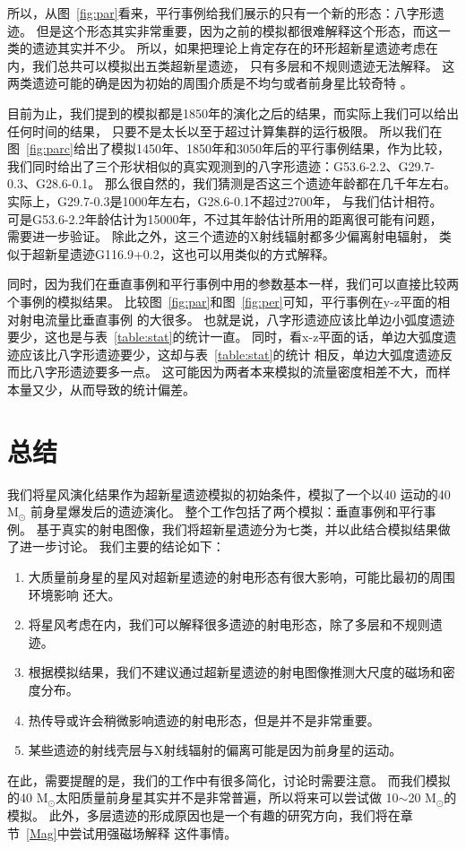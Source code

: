 所以，从图~\ref{fig:par}看来，平行事例给我们展示的只有一个新的形态：八字形遗迹。
但是这个形态其实非常重要，因为之前的模拟都很难解释这个形态，而这一类的遗迹其实并不少。
所以，如果把理论上肯定存在的环形超新星遗迹考虑在内，我们总共可以模拟出五类超新星遗迹，
只有多层和不规则遗迹无法解释。
这两类遗迹可能的确是因为初始的周围介质是不均匀或者前身星比较奇特
\citep{Orlando2007,Orlando2017}。

目前为止，我们提到的模拟都是1850年的演化之后的结果，而实际上我们可以给出任何时间的结果，
只要不是太长以至于超过计算集群的运行极限。
所以我们在图~\ref{fig:parc}给出了模拟1450年、1850年和3050年后的平行事例结果，作为比较，
我们同时给出了三个形状相似的真实观测到的八字形遗迹：G53.6-2.2、G29.7-0.3、G28.6-0.1。
那么很自然的，我们猜测是否这三个遗迹年龄都在几千年左右。
实际上，G29.7-0.3是1000年左右\citep{Leahy2008}，G28.6-0.1不超过2700年\citep{Bamba2001}，
与我们估计相符。
可是G53.6-2.2年龄估计为15000年\citet{Long1991}，不过其年龄估计所用的距离很可能有问题，
需要进一步验证。
除此之外，这三个遗迹的X射线辐射都多少偏离射电辐射\citep{Broersen2015,Su2009,Bamba2001}，
类似于超新星遗迹G116.9+0.2，这也可以用类似的方式解释。

同时，因为我们在垂直事例和平行事例中用的参数基本一样，我们可以直接比较两个事例的模拟结果。
比较图~\ref{fig:par}和图~\ref{fig:per}可知，平行事例在y-z平面的相对射电流量比垂直事例
的大很多。
也就是说，八字形遗迹应该比单边小弧度遗迹要少，这也是与表~\ref{table:stat}的统计一直。
同时，看x-z平面的话，单边大弧度遗迹应该比八字形遗迹要少，这却与表~\ref{table:stat}的统计
相反，单边大弧度遗迹反而比八字形遗迹要多一点。
这可能因为两者本来模拟的流量密度相差不大，而样本量又少，从而导致的统计偏差。

\section{总结}
\label{SWsum}
我们将星风演化结果作为超新星遗迹模拟的初始条件，模拟了一个以40 \kms 运动的40 M$_{\odot}$
前身星爆发后的遗迹演化。
整个工作包括了两个模拟：垂直事例和平行事例。
基于真实的射电图像，我们将超新星遗迹分为七类，并以此结合模拟结果做了进一步讨论。
我们主要的结论如下：

\begin{enumerate}

    \item 大质量前身星的星风对超新星遗迹的射电形态有很大影响，可能比最初的周围环境影响
    还大。

    \item 将星风考虑在内，我们可以解释很多遗迹的射电形态，除了多层和不规则遗迹。

    \item 根据模拟结果，我们不建议通过超新星遗迹的射电图像推测大尺度的磁场和密度分布。

    \item 热传导或许会稍微影响遗迹的射电形态，但是并不是非常重要。

    \item 某些遗迹的射线壳层与X射线辐射的偏离可能是因为前身星的运动。

\end{enumerate}

在此，需要提醒的是，我们的工作中有很多简化，讨论时需要注意。
而我们模拟的40 M$_{\odot}$太阳质量前身星其实并不是非常普遍，所以将来可以尝试做
10$\sim$20 M$_{\odot}$的模拟。
此外，多层遗迹的形成原因也是一个有趣的研究方向，我们将在章节~\ref{Mag}中尝试用强磁场解释
这件事情。
